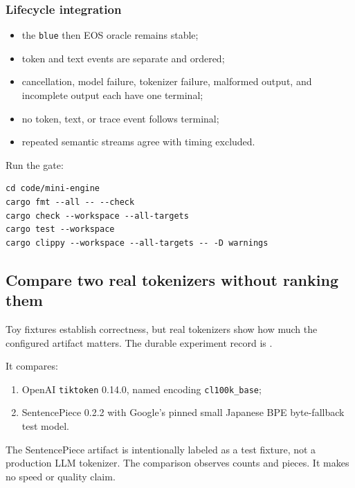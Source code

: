 \documentclass[
  10pt,
]{article}
\providecommand{\tightlist}{%
  \setlength{\itemsep}{0pt}\setlength{\parskip}{0pt}}
\begin{document}
\subsubsection{Lifecycle integration}\label{lifecycle-integration}

\begin{itemize}
\tightlist
\item
  the \texttt{blue} then EOS oracle remains stable;
\item
  token and text events are separate and ordered;
\item
  cancellation, model failure, tokenizer failure, malformed output, and
  incomplete output each have one terminal;
\item
  no token, text, or trace event follows terminal;
\item
  repeated semantic streams agree with timing excluded.
\end{itemize}

Run the gate:

\begin{verbatim}
cd code/mini-engine
cargo fmt --all -- --check
cargo check --workspace --all-targets
cargo test --workspace
cargo clippy --workspace --all-targets -- -D warnings
\end{verbatim}

\subsection{Compare two real tokenizers without ranking
them}\label{compare-two-real-tokenizers-without-ranking-them}

Toy fixtures establish correctness, but real tokenizers show how much
the configured artifact matters. The durable experiment record is
\href{https://github.com/hermonai/inside-the-llm-engine/blob/astra-visual-rewrite/research/part-01/tokenizer-comparison.md}{\texttt{}}.

It compares:

\begin{enumerate}
\def\labelenumi{\arabic{enumi}.}
\tightlist
\item
  OpenAI \texttt{tiktoken} 0.14.0, named encoding \texttt{cl100k\_base};
\item
  SentencePiece 0.2.2 with Google's pinned small Japanese BPE
  byte-fallback test model.
\end{enumerate}

The SentencePiece artifact is intentionally labeled as a test fixture,
not a production LLM tokenizer. The comparison observes counts and
pieces. It makes no speed or quality claim.
\end{document}
